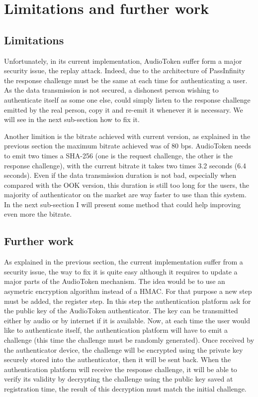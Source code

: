 \documentclass[twocolumn,14pt]{extarticle}
\begin{document}
\section{Limitations and further work}
\label{sec:limitationsfurtherwork}
\subsection{Limitations}
Unfortunately, in its current implementation, AudioToken suffer form a major security issue, the replay attack. Indeed, due to the architecture of PassInfinity the response challenge must be the same at each time for authenticating a user. As the data transmission is not secured, a dishonest person wishing to authenticate itself as some one else, could simply listen to the response challenge emitted by the real person, copy it and re-emit it whenever it is necessary. We will see in the next sub-section how to fix it.

Another limition is the bitrate achieved with current version, as explained in the previous section the maximum bitrate achieved was of 80 bps. AudioToken needs to emit two times a SHA-256 (one is the request challenge, the other is the response challenge), with the current bitrate it takes two times 3.2 seconds (6.4 seconds). Even if the data transmission duration is not bad, especially when compared with the OOK version, this duration is still too long for the users, the majority of authenticator on the market are way faster to use than this system. In the next sub-section I will present some method that could help improving even more the bitrate.

\subsection{Further work}
\label{sec:furtherwork}
As explained in the previous section, the current implementation suffer from a security issue, the way to fix it is quite easy although it requires to update a major parts of the AudioToken mechanism. The idea would be to use an asymetric encryption algorithm instead of a HMAC. For that purpose a new step must be added, the register step. In this step the authentication platform ask for the public key of the AudioToken authenticator. The key can be transmitted either by audio or by internet if it is available. Now, at each time the user would like to authenticate itself, the authentication platform will have to emit a challenge (this time the challenge must be randomly generated). Once received by the authenticator device, the challenge will be encrypted using the private key securely stored into the authenticator, then it will be sent back. When the authentication platform will receive the response challenge, it will be able to verify its validity by decrypting the challenge using the public key saved at registration time, the result of this decryption must match the initial challenge.
\end{document}
